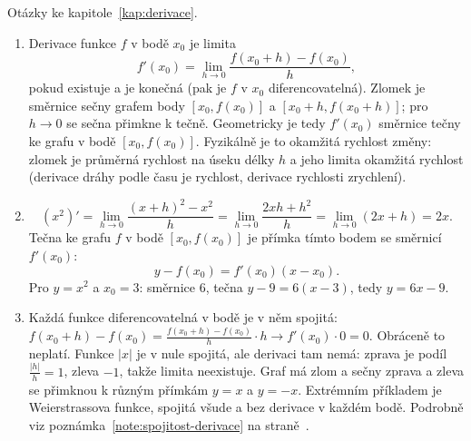 Otázky ke kapitole~\ref{kap:derivace}.

\begin{enumerate}[label=\textbf{\arabic*.}, leftmargin=*, itemsep=0.8em]
  \item {}
  Derivace funkce $f$ v bodě $x_0$ je limita
  \begin{equation*}
    f'(x_0) = \lim_{h\to 0}\frac{f(x_0 + h) - f(x_0)}{h},
  \end{equation*}
  pokud existuje a je konečná (pak je $f$ v $x_0$ diferencovatelná). Zlomek je směrnice sečny grafem body $[x_0, f(x_0)]$ a $[x_0 + h, f(x_0 + h)]$; pro $h\to 0$ se sečna přimkne k tečně. Geometricky je tedy $f'(x_0)$ směrnice tečny ke grafu v bodě $[x_0, f(x_0)]$. Fyzikálně je to okamžitá rychlost změny: zlomek je průměrná rychlost na úseku délky $h$ a jeho limita okamžitá rychlost (derivace dráhy podle času je rychlost, derivace rychlosti zrychlení). 

  \item {}
  \begin{equation*}
    (x^2)' = \lim_{h\to 0}\frac{{(x + h)}^2 - x^2}{h} = \lim_{h\to 0}\frac{2xh + h^2}{h} = \lim_{h\to 0}(2x + h) = 2x.
  \end{equation*}
  Tečna ke grafu $f$ v bodě $[x_0, f(x_0)]$ je přímka tímto bodem se směrnicí $f'(x_0)$:
  \begin{equation*}
    y - f(x_0) = f'(x_0)(x - x_0).
  \end{equation*}
  Pro $y = x^2$ a $x_0 = 3$: směrnice $6$, tečna $y - 9 = 6(x - 3)$, tedy $y = 6x - 9$. 

  \item {}
  Každá funkce diferencovatelná v bodě je v něm spojitá: $f(x_0 + h) - f(x_0) = \frac{f(x_0 + h) - f(x_0)}{h}\cdot h\to f'(x_0)\cdot 0 = 0$. Obráceně to neplatí. Funkce $|x|$ je v nule spojitá, ale derivaci tam nemá: zprava je podíl $\frac{|h|}{h} = 1$, zleva $-1$, takže limita neexistuje. Graf má zlom a sečny zprava a zleva se přimknou k různým přímkám $y = x$ a $y = -x$. Extrémním příkladem je Weierstrassova funkce, spojitá všude a bez derivace v každém bodě. Podrobně viz poznámka~\ref{note:spojitost-derivace} na straně~\pageref{note:spojitost-derivace}.


\end{enumerate}
